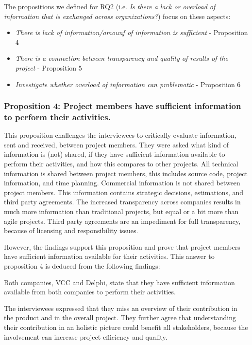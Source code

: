 The propositions we defined for  
RQ2 (i.e. {\em Is there a lack or overload of information that is exchanged across organizations?}) focus on these aspects:

\begin{itemize}
\item {\em There is lack of information/amounf of information is sufficient} - Proposition 4 %
\item {\em There is a connection between transparency and quality of results of the project} - Proposition 5 %
\item {\em Investigate whether overload of information can problematic} - Proposition 6
\end{itemize}

\subsubsection{Proposition 4: Project members have sufficient information to perform their activities.}

This proposition challenges the interviewees to critically evaluate information, sent and received, between project members. They were asked what kind of information is (not) shared, if they have sufficient information available to perform their activities, and how this compares to other projects. All technical information is shared between project members, this includes source code, project information, and time planning. Commercial information is not shared between project members. This information contains strategic decisions, estimations, and third party agreements. The increased transparency across companies results in much more information than traditional projects, but equal or a bit more than agile projects. Third party agreements are an impediment for full transparency, because of licensing and responsibility issues.

However, the findings support this proposition and prove that project members have sufficient information available for their activities. This answer to proposition 4 is deduced from the following findings:

 Both companies, VCC and Delphi, state that they have sufficient information available from both companies to perform their activities. 

 The interviewees expressed that they miss an overview of their contribution in the product and in the overall project. They further agree that understanding their contribution in an holistic picture could benefit all stakeholders, because the involvement can increase project efficiency and quality.

